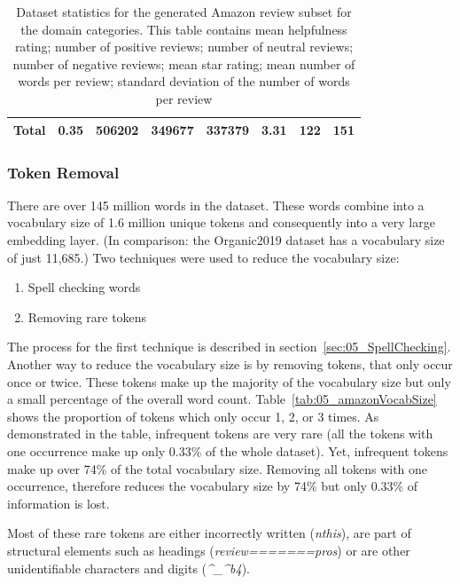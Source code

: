 \begin{table}
\begin{tabularx}{\textwidth}{lXrrrcrr}
		\midrule
		Total						&	0.35 & 	   506202 &	349677& 337379&    3.31 &	 122 &  151 \\
		\bottomrule
	\end{tabularx}
	\caption{Dataset statistics for the generated Amazon review subset for the domain categories. This table contains mean helpfulness rating; number of positive reviews; number of neutral reviews; number of negative reviews; mean star rating; mean number of words per review; standard deviation of the number of words per review }
		\label{tab:05_amazonDatasetStats}
\end{table}

\subsubsection*{Token Removal}
\label{sec:05_amazonTokens}
There are over 145 million words in the dataset. These words combine into a vocabulary size of 1.6 million unique tokens and consequently into a very large embedding layer. {(In comparison: the Organic2019 dataset has a vocabulary size of just 11,685.)} Two techniques were used to reduce the vocabulary size:

\begin{enumerate}
	\item Spell checking words
	\item Removing rare tokens
\end{enumerate}

The process for the first technique is described in section~\ref{sec:05_SpellChecking}. Another way to reduce the vocabulary size is by removing tokens, that only occur once or twice. These tokens make up the majority of the vocabulary size but only a small percentage of the overall word count. Table~\ref{tab:05_amazonVocabSize} shows the proportion of tokens which only occur 1, 2, or 3 times. As demonstrated in the table, infrequent tokens are very rare {(all the tokens with one occurrence make up only 0.33\% of the whole dataset)}. Yet, infrequent tokens make up over 74\% of the total vocabulary size. Removing all tokens with one occurrence, therefore reduces the vocabulary size by 74\% but only 0.33\% of information is lost.

Most of these rare tokens are either incorrectly written {(\textit{nthis})}, are part of structural elements such as headings {(\textit{review=======pros})} or are other unidentifiable characters and digits ({\textit{\^{}\_\^{}b4}}).

